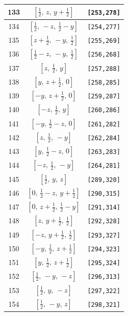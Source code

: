 \documentclass[fleqn,8pt]{jsarticle}
\begin{document}
\begin{longtable}{ccc}
133 & $\left[ \frac{1}{2},\, z,\, y + \frac{1}{2} \right]$ & {\tt [253,278]} \\ \hline
134 & $\left[ \frac{1}{2},\, - z,\, \frac{1}{2} - y \right]$ & {\tt [254,277]} \\ \hline
135 & $\left[ z + \frac{1}{2},\, - y,\, \frac{1}{2} \right]$ & {\tt [255,269]} \\ \hline
136 & $\left[ \frac{1}{2} - z,\, - y,\, \frac{1}{2} \right]$ & {\tt [256,268]} \\ \hline
137 & $\left[ z,\, \frac{1}{2},\, y \right]$ & {\tt [257,288]} \\ \hline
138 & $\left[ y,\, z + \frac{1}{2},\, 0 \right]$ & {\tt [258,285]} \\ \hline
139 & $\left[ - y,\, z + \frac{1}{2},\, 0 \right]$ & {\tt [259,287]} \\ \hline
140 & $\left[ - z,\, \frac{1}{2},\, y \right]$ & {\tt [260,286]} \\ \hline
141 & $\left[ - y,\, \frac{1}{2} - z,\, 0 \right]$ & {\tt [261,282]} \\ \hline
142 & $\left[ z,\, \frac{1}{2},\, - y \right]$ & {\tt [262,284]} \\ \hline
143 & $\left[ y,\, \frac{1}{2} - z,\, 0 \right]$ & {\tt [263,283]} \\ \hline
144 & $\left[ - z,\, \frac{1}{2},\, - y \right]$ & {\tt [264,281]} \\ \hline
145 & $\left[ \frac{1}{2},\, y,\, z \right]$ & {\tt [289,320]} \\ \hline
146 & $\left[ 0,\, \frac{1}{2} - z,\, y + \frac{1}{2} \right]$ & {\tt [290,315]} \\ \hline
147 & $\left[ 0,\, z + \frac{1}{2},\, \frac{1}{2} - y \right]$ & {\tt [291,314]} \\ \hline
148 & $\left[ z,\, y + \frac{1}{2},\, \frac{1}{2} \right]$ & {\tt [292,328]} \\ \hline
149 & $\left[ - z,\, y + \frac{1}{2},\, \frac{1}{2} \right]$ & {\tt [293,327]} \\ \hline
150 & $\left[ - y,\, \frac{1}{2},\, z + \frac{1}{2} \right]$ & {\tt [294,323]} \\ \hline
151 & $\left[ y,\, \frac{1}{2},\, z + \frac{1}{2} \right]$ & {\tt [295,324]} \\ \hline
152 & $\left[ \frac{1}{2},\, - y,\, - z \right]$ & {\tt [296,313]} \\ \hline
153 & $\left[ \frac{1}{2},\, y,\, - z \right]$ & {\tt [297,322]} \\ \hline
154 & $\left[ \frac{1}{2},\, - y,\, z \right]$ & {\tt [298,321]} \\ \hline

\end{longtable}
\end{document}
